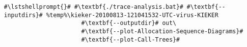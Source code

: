 \begin{lstlisting}[caption=Commands to produce the diagrams under Windows,label=lst:traceAnalysis:sequenceDiagramWin]
#\lstshellprompt{}# #\textbf{./trace-analysis.bat}# #\textbf{--inputdirs}# %temp%\kieker-20100813-121041532-UTC-virus-KIEKER
                      #\textbf{--outputdir}# out\
                      #\textbf{--plot-Allocation-Sequence-Diagrams}#
                      #\textbf{--plot-Call-Trees}#		
\end{lstlisting}

